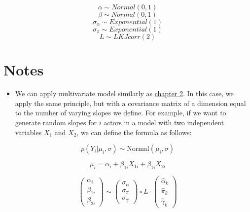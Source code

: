 \documentclass[
  letterpaper,
  DIV=11,
  numbers=noendperiod]{scrreprt}
\providecommand{\tightlist}{%
  \setlength{\itemsep}{0pt}\setlength{\parskip}{0pt}}\usepackage{longtable,booktabs,array}
\begin{document}
\[
\alpha \sim Normal(0,1)
\] \[
\beta \sim Normal(0,1)
\] \[
\sigma_\alpha \sim Exponential(1)
\] \[
\sigma_\pi \sim Exponential(1)
\] \[
L \sim LKJcorr(2)
\]

\section{Notes}\label{notes-5}

\begin{tcolorbox}[enhanced jigsaw, toptitle=1mm, opacityback=0, titlerule=0mm, breakable, bottomrule=.15mm, colframe=quarto-callout-note-color-frame, arc=.35mm, coltitle=black, left=2mm, opacitybacktitle=0.6, leftrule=.75mm, toprule=.15mm, rightrule=.15mm, bottomtitle=1mm, colbacktitle=quarto-callout-note-color!10!white, title=\textcolor{quarto-callout-note-color}{\faInfo}\hspace{0.5em}{Note}, colback=white]

\begin{itemize}
\tightlist
\item
  We can apply multivariate model similarly as
  \href{./2.\%20Multiple\%20Regression\%20for\%20Continuous\%20Variables.qmd}{chapter
  2}. In this case, we apply the same principle, but with a covariance
  matrix of a dimension equal to the number of varying slopes we define.
  For example, if we want to generate random slopes for \(i\) actors in
  a model with two independent variables \(X_1\) and \(X_2\), we can
  define the formula as follows:
\end{itemize}

\[
p(Y_{i} |\mu_i , \sigma) \sim \text{Normal}(\mu_i , \sigma) 
\]

\[
\mu_i =   \alpha_i + \beta_{1i} X_{1i}  + \beta_{1i} X_{2i} 
\]

\[ 
\begin{pmatrix} 
\alpha_{i}\\ 
\beta_{1i}\\ 
\beta_{2i} 
\end{pmatrix} 
\sim \begin{pmatrix} 
\sigma_{\alpha}\\ 
\sigma_{\pi}\\ 
\sigma_{\gamma} 
\end{pmatrix} \circ L \cdot \begin{pmatrix} 
\widehat{\alpha}_{k} \\ 
\widehat{\pi}_{k} \\ 
\widehat{\gamma}_{k} 
\end{pmatrix} 
\]


\end{tcolorbox}
\end{document}
